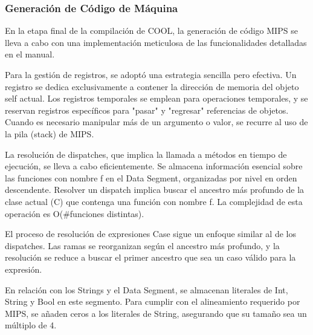 \documentclass[10pt]{article} %
\begin{document}
	\subsubsection{Generaci\'on de C\'odigo de M\'aquina}

	En la etapa final de la compilación de COOL, la generación de código MIPS se lleva a cabo con una implementación meticulosa de las funcionalidades detalladas en el manual.
	
	Para la gestión de registros, se adoptó una estrategia sencilla pero efectiva. Un registro se dedica exclusivamente a contener la dirección de memoria del objeto self actual. Los registros temporales se emplean para operaciones temporales, y se reservan registros específicos para "pasar" y "regresar" referencias de objetos. Cuando es necesario manipular más de un argumento o valor, se recurre al uso de la pila (stack) de MIPS.
	
	La resolución de dispatches, que implica la llamada a métodos en tiempo de ejecución, se lleva a cabo eficientemente. Se almacena información esencial sobre las funciones con nombre f en el Data Segment, organizadas por nivel en orden descendente. Resolver un dispatch implica buscar el ancestro más profundo de la clase actual (C) que contenga una función con nombre f. La complejidad de esta operación es O(\#funciones distintas).
	
	El proceso de resolución de expresiones Case sigue un enfoque similar al de los dispatches. Las ramas se reorganizan según el ancestro más profundo, y la resolución se reduce a buscar el primer ancestro que sea un caso válido para la expresión.
	
	En relación con los Strings y el Data Segment, se almacenan literales de Int, String y Bool en este segmento. Para cumplir con el alineamiento requerido por MIPS, se añaden ceros a los literales de String, asegurando que su tamaño sea un múltiplo de 4.
	
\end{document}
